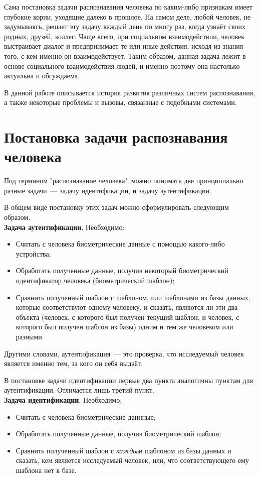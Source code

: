 \documentclass[14pt, a4paper]{extarticle}
\begin{document}
Сама постановка задачи распознавания человека по каким-либо признакам имеет глубокие корни, уходящие далеко в прошлое. На самом деле, любой человек, не задумываясь, решает эту задачу каждый день по многу раз, когда узнаёт своих родных, друзей, коллег. Чаще всего, при социальном взаимодействии, человек выстраивает диалог и предпринимает те или иные действия, исходя из знания того, с кем именно он взаимодействует. Таким образом, данная задача лежит в основе социального взаимодействия людей, и именно поэтому она настолько актуальна и обсуждаема.

В данной работе описывается история развития различных систем распознавания, а также некоторые проблемы и вызовы, связанные с подобными системами.

\newpage
\section{Постановка задачи распознавания человека}
Под термином "распознавание человека"\ можно понимать две принципиально разные задачи~--- задачу идентификации, и задачу аутентификации. 


В общем виде постановку этих задач можно сформулировать следующим образом. \\
\textbf{Задача аутентификации}. Необходимо:
\begin{itemize}
	\item Считать с человека биометрические данные с помощью какого-либо устройства;
	\item Обработать полученные данные, получив некоторый биометрический идентификатор человека (биометрический шаблон);
	\item Сравнить полученный шаблон с шаблоном, или шаблонами из базы данных, которые соответствуют одному человеку, и сказать, являются ли эти два объекта (человек, с которого был получен текущий шаблон, и человек, с которого был получен шаблон из базы) одним и тем же человеком или разными.
\end{itemize}

Другими словами, аутентификация~--- это проверка, что исследуемый человек является именно тем, за кого он себя выдаёт.

В постановке задачи идентификации первые два пункта аналогичны пунктам для аутентификации. Отличается лишь третий пункт.\\
\textbf{Задача идентификации}. Необходимо:
\begin{itemize}
	\item Считать с человека биометрические даннные;
	\item Обработать полученные данные, получив биометрический шаблон;
	\item Сравнить полученный шаблон с \textit{каждым} шаблоном из базы данных и сказать, кем является исследуемый человек, или, что соответствующего ему шаблона нет в базе.
\end{itemize}
\end{document}
